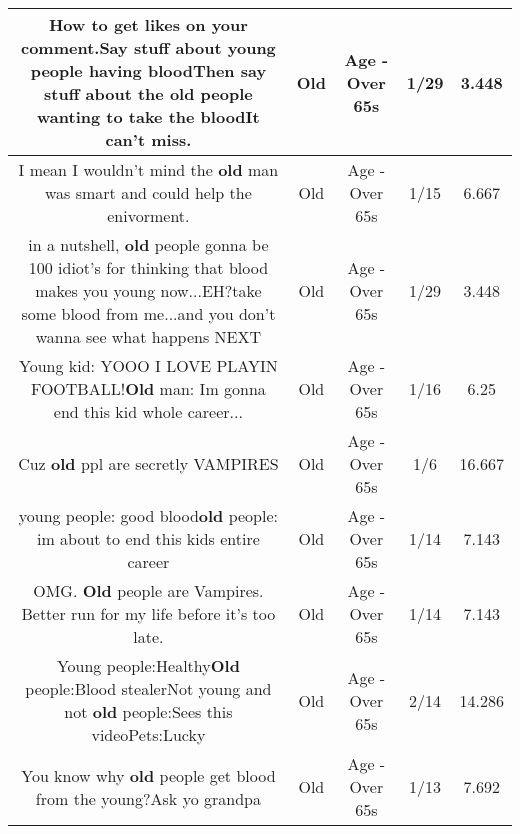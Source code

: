\documentclass[11pt]{article}
\newlength\mylength
\begin{document}
\begin{center}
\begin{longtable}{|C{.65\mylength}|C{.30\mylength}|C{.12\mylength}|C{.12\mylength}|C{.12\mylength}|}
  \small How to get likes on your comment.Say stuff about young people having bloodThen say stuff about the \textbf{old} people wanting to take the bloodIt can't miss.\normalsize   & Old & Age - Over 65s & 1/29 & 3.448 \\  \hline
  \small I mean I wouldn't mind the \textbf{old} man was smart and could help the enivorment.\normalsize   & Old & Age - Over 65s & 1/15 & 6.667 \\  \hline
  \small in a nutshell, \textbf{old} people gonna be 100 idiot's for thinking that blood makes you young now...EH?take some blood from me...and you don't wanna see what happens NEXT\normalsize   & Old & Age - Over 65s & 1/29 & 3.448 \\  \hline
  \small Young kid: YOOO I LOVE PLAYIN FOOTBALL!\textbf{Old} man: Im gonna end this kid whole career...\normalsize   & Old & Age - Over 65s & 1/16 & 6.25 \\  \hline
  \small Cuz \textbf{old} ppl are secretly VAMPIRES\normalsize   & Old & Age - Over 65s & 1/6 & 16.667 \\  \hline
  \small young people: good blood\textbf{old} people: im about to end this kids entire career\normalsize   & Old & Age - Over 65s & 1/14 & 7.143 \\  \hline
  \small OMG. \textbf{Old} people are Vampires. Better run for my life before it's too late.\normalsize   & Old & Age - Over 65s & 1/14 & 7.143 \\  \hline
  \small Young people:Healthy\textbf{Old} people:Blood stealerNot young and not \textbf{old} people:Sees this videoPets:Lucky\normalsize   & Old & Age - Over 65s & 2/14 & 14.286 \\  \hline
  \small You know why \textbf{old} people get blood from the young?Ask yo grandpa\normalsize   & Old & Age - Over 65s & 1/13 & 7.692 \\  \hline

\end{longtable}
\end{center}
\end{document}
